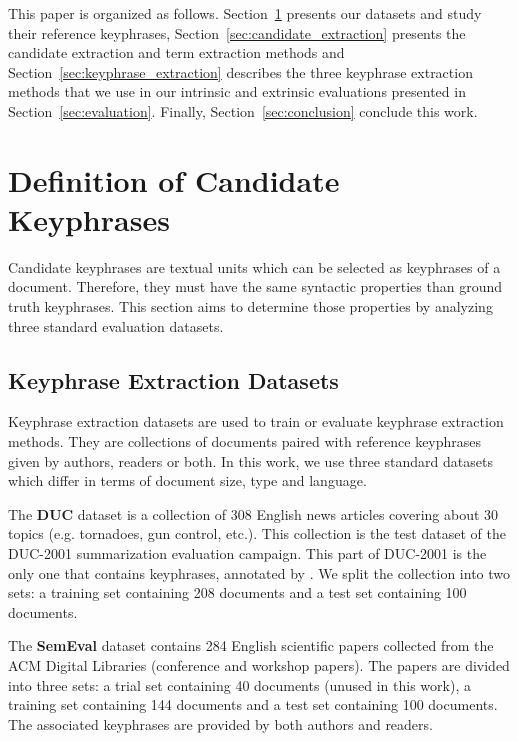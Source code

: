   This paper is organized as follows.
  Section~\ref{sec:definition_of_candidate_keyphrases} presents our datasets and
  study their reference keyphrases, Section~\ref{sec:candidate_extraction}
  presents the candidate extraction and term extraction methods and
  Section~\ref{sec:keyphrase_extraction} describes the three keyphrase
  extraction methods that we use in our intrinsic and extrinsic evaluations
  presented in Section~\ref{sec:evaluation}. Finally,
  Section~\ref{sec:conclusion} conclude this work.

\section{Definition of Candidate Keyphrases}
\label{sec:definition_of_candidate_keyphrases}
  Candidate keyphrases are textual units which can be selected as keyphrases
  of a document. Therefore, they must have the same syntactic properties than
  ground truth keyphrases. This section aims to determine those properties by
  analyzing three standard evaluation datasets.

  \subsection{Keyphrase Extraction Datasets}
  \label{subsec:keyphrase_extraction_datasets}
    Keyphrase extraction datasets are used to train or evaluate keyphrase
    extraction methods. They are collections of documents paired with reference
    keyphrases given by authors, readers or both. In this work, we use three
    standard datasets which differ in terms of document size,  type and
    language.

    The \textbf{DUC} dataset \cite{over2001duc} is a collection of 308 English
    news articles covering about 30 topics (e.g. tornadoes, gun control, etc.).
    This collection is the test dataset of the DUC-2001 summarization evaluation
    campaign. This part of DUC-2001 is the only one that contains keyphrases,
    annotated by . We split the collection into two
    sets: a training set containing 208 documents and a test set containing 100
    documents.

    The \textbf{SemEval} dataset \cite{kim2010semeval} contains 284 English
    scientific papers collected from the ACM Digital Libraries (conference and
    workshop papers). The papers are divided into three sets: a trial set
    containing 40 documents (unused in this work), a training set containing 144
    documents and a test set containing 100 documents. The associated keyphrases
    are provided by both authors and readers.

